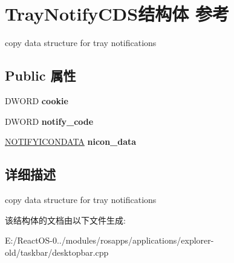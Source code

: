 \hypertarget{struct_tray_notify_c_d_s}{}\section{Tray\+Notify\+C\+D\+S结构体 参考}
\label{struct_tray_notify_c_d_s}


copy data structure for tray notifications  


\subsection*{Public 属性}
\begin{DoxyCompactItemize}
\item 
\mbox{\label{struct_tray_notify_c_d_s_a2c0ada9f11edf53683fbe804327d3da7}} 
D\+W\+O\+RD {\bfseries cookie}
\item 
\mbox{\label{struct_tray_notify_c_d_s_a72d5b96ba9252096a0d4ea7f75e5607a}} 
D\+W\+O\+RD {\bfseries notify\+\_\+code}
\item 
\mbox{\label{struct_tray_notify_c_d_s_aec6e13556feec819ea44fa342f2e3cf9}} 
\hyperlink{struct___n_o_t_i_f_y_i_c_o_n_d_a_t_a_a}{N\+O\+T\+I\+F\+Y\+I\+C\+O\+N\+D\+A\+TA} {\bfseries nicon\+\_\+data}
\end{DoxyCompactItemize}


\subsection{详细描述}
copy data structure for tray notifications 

该结构体的文档由以下文件生成\+:\begin{DoxyCompactItemize}
\item 
E\+:/\+React\+O\+S-\/0../modules/rosapps/applications/explorer-\/old/taskbar/desktopbar.\+cpp\end{DoxyCompactItemize}
